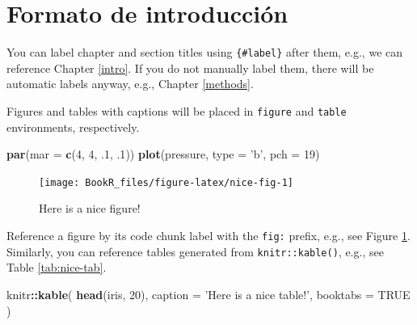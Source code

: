 \documentclass[
]{book}
\newenvironment{Shaded}{\begin{snugshade}}{\end{snugshade}}
\newcommand{\DataTypeTok}[1]{\textcolor[rgb]{0.13,0.29,0.53}{#1}}
\newcommand{\DecValTok}[1]{\textcolor[rgb]{0.00,0.00,0.81}{#1}}
\newcommand{\FloatTok}[1]{\textcolor[rgb]{0.00,0.00,0.81}{#1}}
\newcommand{\KeywordTok}[1]{\textcolor[rgb]{0.13,0.29,0.53}{\textbf{#1}}}
\newcommand{\NormalTok}[1]{#1}
\newcommand{\OperatorTok}[1]{\textcolor[rgb]{0.81,0.36,0.00}{\textbf{#1}}}
\newcommand{\OtherTok}[1]{\textcolor[rgb]{0.56,0.35,0.01}{#1}}
\newcommand{\StringTok}[1]{\textcolor[rgb]{0.31,0.60,0.02}{#1}}
\begin{document}
\hypertarget{formato-de-introducciuxf3n}{%
\section{Formato de introducción}\label{formato-de-introducciuxf3n}}

You can label chapter and section titles using \texttt{\{\#label\}} after them, e.g., we can reference Chapter \ref{intro}. If you do not manually label them, there will be automatic labels anyway, e.g., Chapter \ref{methods}.

Figures and tables with captions will be placed in \texttt{figure} and \texttt{table} environments, respectively.

\begin{Shaded}
\begin{Highlighting}[]
\KeywordTok{par}\NormalTok{(}\DataTypeTok{mar =} \KeywordTok{c}\NormalTok{(}\DecValTok{4}\NormalTok{, }\DecValTok{4}\NormalTok{, }\FloatTok{.1}\NormalTok{, }\FloatTok{.1}\NormalTok{))}
\KeywordTok{plot}\NormalTok{(pressure, }\DataTypeTok{type =} \StringTok{'b'}\NormalTok{, }\DataTypeTok{pch =} \DecValTok{19}\NormalTok{)}
\end{Highlighting}
\end{Shaded}

\begin{figure}

{\centering \texttt{[image: BookR\_files/figure-latex/nice-fig-1]} 

}

\caption{Here is a nice figure!}\label{fig:nice-fig}
\end{figure}

Reference a figure by its code chunk label with the \texttt{fig:} prefix, e.g., see Figure \ref{fig:nice-fig}. Similarly, you can reference tables generated from \texttt{knitr::kable()}, e.g., see Table \ref{tab:nice-tab}.

\begin{Shaded}
\begin{Highlighting}[]
\NormalTok{knitr}\OperatorTok{::}\KeywordTok{kable}\NormalTok{(}
  \KeywordTok{head}\NormalTok{(iris, }\DecValTok{20}\NormalTok{), }\DataTypeTok{caption =} \StringTok{'Here is a nice table!'}\NormalTok{,}
  \DataTypeTok{booktabs =} \OtherTok{TRUE}
\NormalTok{)}
\end{Highlighting}
\end{Shaded}
\end{document}
